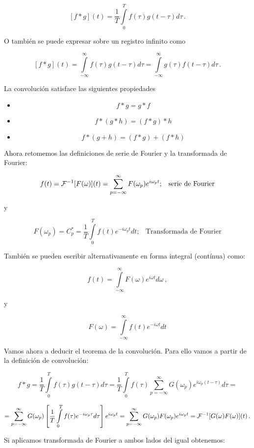 \documentclass[
]{agujournal2019}
\begin{document}
\[[f*g](t)=\frac{1}{T}\int\limits^{T}_{0}f(\tau)g(t-\tau) d\tau\,.\]

O también se puede expresar sobre un registro infinito como

\[[f*g](t)=\int\limits^{\infty}_{-\infty}f(\tau)g(t-\tau) d\tau = \int\limits^{\infty}_{-\infty}g(\tau)f(t-\tau) d\tau\,.\]

La convolución satisface las siguientes propiedades

\begin{itemize}
\item
  \[f*g=g*f\]
\item
  \[f*(g*h)=(f*g)*h\]
\item
  \[f*(g+h)=(f*g)+(f*h)\]
\end{itemize}

Ahora retomemos las definiciones de serie de Fourier y la transformada
de Fourier:

\begin{framed}
$$f(t)={\cal F}^{-1}[F(\omega)](t)=\sum\limits^{\infty}_{p=-\infty} F(\omega_p) e^{i\omega_p t};\,\,\,\,\,\text{serie de Fourier}$$

y

$$F(\omega_p)=C^*_p=\frac{1}{T}\int\limits^{T}_{0}f(t)e^{-i\omega_p t} dt;\,\,\,\,\,\text{Transformada de Fourier}$$

También se pueden escribir alternativamente en forma integral (contínua) como:

$$f(t)=\int\limits^{\infty}_{-\infty} F(\omega) e^{i\omega t} d\omega\,,$$

y

$$F(\omega)=\int\limits^{\infty}_{-\infty}f(t)e^{-i\omega t} dt$$

\end{framed}

Vamos ahora a deducir el teorema de la convolución. Para ello vamos a
partir de la definición de convolución:

\[f*g=\frac{1}{T}\int\limits^{T}_{0}f(\tau)g(t-\tau) d\tau=
      \frac{1}{T}\int\limits^{T}_{0}f(\tau)\sum\limits^{\infty}_{p=-\infty} G(\omega_p) e^{i\omega_p (t-\tau)} d\tau=\]

\[=\sum\limits^{\infty}_{p=-\infty} G(\omega_p) \left[\frac{1}{T}\int\limits^{T}_{0}f(\tau)e^{-i\omega_p \tau} d\tau \right]
e^{i\omega_p t}=\sum\limits^{\infty}_{p=-\infty} G(\omega_p)F(\omega_p)
e^{i\omega_p t}={\cal F}^{-1}[G(\omega)F(\omega)](t)\,.\]

Si aplicamos transformada de Fourier a ambos lados del igual obtenemos:
\end{document}
